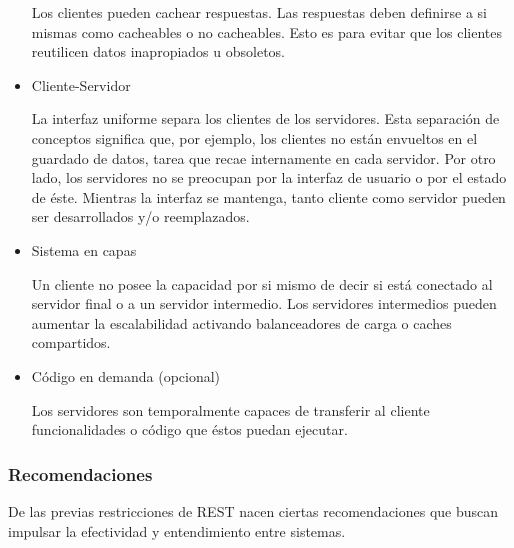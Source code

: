 \begin{itemize}
	Los clientes pueden cachear respuestas. Las respuestas deben definirse a si mismas 
	como cacheables o no cacheables. Esto es para evitar que los clientes reutilicen datos 
	inapropiados u obsoletos.
	
	\item Cliente-Servidor 
	
	La interfaz uniforme separa los clientes de los servidores. Esta separación de 
	conceptos significa que, por ejemplo, los clientes no están envueltos en el guardado 
	de datos, tarea que recae internamente en cada servidor. Por otro lado, los servidores
	no se preocupan por la interfaz de usuario o por el estado de éste. Mientras la 
	interfaz se mantenga, tanto cliente como servidor pueden ser desarrollados y/o 
	reemplazados.
	
	\item Sistema en capas
	
	Un cliente no posee la capacidad por si mismo de decir si está conectado al 
	servidor final o a un servidor intermedio. Los servidores intermedios pueden aumentar 
	la escalabilidad activando balanceadores de carga o caches compartidos.
	
	\item Código en demanda (opcional)
	
	Los servidores son temporalmente capaces de transferir al cliente funcionalidades o 
	código que éstos puedan ejecutar.

\end{itemize}


\subsubsection{Recomendaciones}

De las previas restricciones de REST nacen ciertas recomendaciones que buscan impulsar la 
efectividad y entendimiento entre sistemas.


